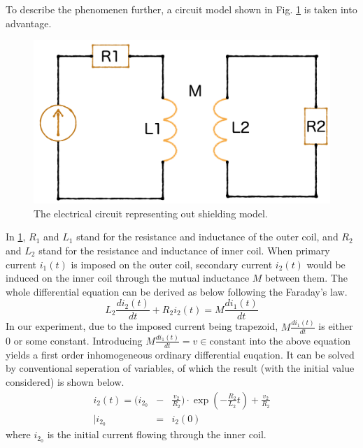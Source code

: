 To describe the phenomenen further, a circuit model shown in Fig. \ref{fig:circuit} is taken into advantage.
\begin{figure}[H]
  \includegraphics[width=18.5cm, bb=9 9 900 550]{./section3Effectiveness/MLGraph.png}
  \caption{The electrical circuit representing out shielding model.}
  \label{fig:circuit}
\end{figure}
In \ref{fig:circuit}, $R_1$ and $L_1$ stand for the resistance and inductance of the outer coil, and
$R_2$ and $L_2$ stand for the resistance and inductance of inner coil.
When primary current $i_1(t)$ is imposed on the outer coil,
secondary current $i_2(t)$ would be induced on the inner coil through the mutual inductance $M$ between them.
The whole differential equation can be derived as below following the Faraday's law.
\begin{equation}
  L_2\frac{di_2(t)}{dt} + R_2i_2(t) = M\frac{di_1(t)}{dt}
\end{equation}
In our experiment, due to the imposed current being trapezoid,
$M\frac{di_1(t)}{dt}$ is either $0$ or some constant.
Introducing $M\frac{di_1(t)}{dt} = v \in \mathrm{constant}$ into the above equation yields a first order inhomogeneous ordinary differential euqation.
It can be solved by conventional seperation of variables, of which the result (with the initial value considered) is shown below.
\begin{eqnarray}
  i_2(t) = (i_{2_0} &-& \frac{v_2}{R_2})\cdot \exp(-\frac{R_2}{L_2}t) + \frac{v_2}{R_2} \\
  | i_{2_0} &=& i_2(0)\nonumber
\end{eqnarray}
where $i_{2_0}$ is the initial current flowing through the inner coil.

